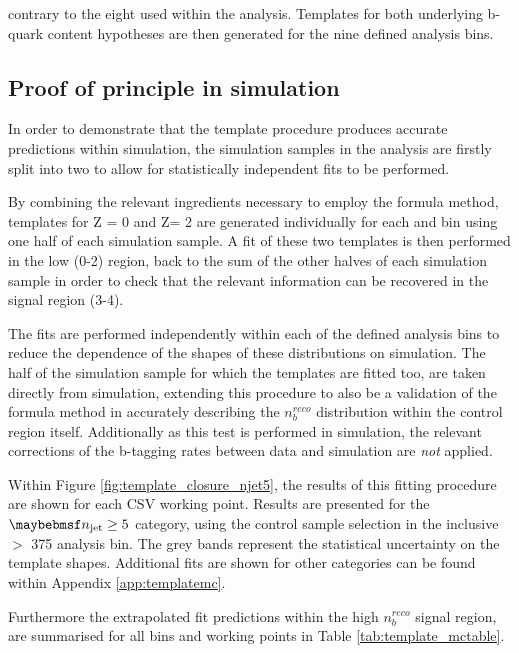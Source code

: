 contrary to the eight used within the \alphat analysis. Templates for both underlying b-quark content hypotheses are then generated for the nine defined analysis bins.

\subsection{Proof of principle in simulation}
\label{subsec:templateclosuretest}

In order to demonstrate that the template procedure produces accurate predictions within simulation, the simulation samples in the analysis are firstly split into two to allow for statistically independent fits to be performed. 

By combining the relevant ingredients necessary to employ the formula method, \nbreco templates for Z = 0 and Z= 2 are generated individually for each \njet and \theht bin using one half of each simulation sample. A fit of these two templates is then performed in the low \nbreco (0-2) region, back to the sum of the other halves of each simulation sample in order to check that the relevant information can be recovered in the \nbreco signal region (3-4).

The fits are performed independently within each of the defined analysis bins to reduce the dependence of the shapes of these distributions on simulation. The half of the simulation sample for which the templates are fitted too, are taken directly from simulation, extending this procedure to also be a validation of the formula method in accurately describing the $n_{b}^{reco}$ distribution within the control region itself. Additionally as this test is performed in simulation, the relevant corrections of the b-tagging rates between data and simulation are \emph{not} applied.  

Within Figure \ref{fig:template_closure_njet5}, the results of this fitting procedure are shown for each \ac{CSV} working point. Results are presented for the $\njet \geq 5$ category, using the \mupjets control sample selection in the inclusive \theht$>$ 375 \GeV analysis bin. The grey bands represent the statistical uncertainty on the template shapes. Additional fits are shown for other \njet categories can be found within Appendix \ref{app:templatemc}. 

Furthermore the extrapolated fit predictions within the high $n_{b}^{reco}$ signal region, are summarised for all \theht bins and working points in Table \ref{tab:template_mctable}. 

